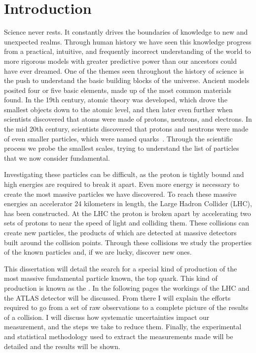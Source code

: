 \chapter{Introduction}
Science never rests. It constantly drives the boundaries of knowledge to new and unexpected realms. Through human history we have seen this knowledge progress from a practical, intuitive, and frequently incorrect understanding of the world to more rigorous models with greater predictive power than our ancestors could have ever dreamed. 
One of the themes seen throughout the history of science is the push to understand the basic building blocks of the universe. Ancient models posited four or five basic elements, made up of the most common materials found. In the 19th century, atomic theory was developed, which drove the smallest objects down to the atomic level, and then later even further when scientists discovered that atoms were made of protons, neutrons, and electrons. In the mid 20th century, scientists discovered that protons and neutrons were made of even smaller particles, which were named quarks~\cite{physicshistory}. Through the scientific process we probe the smallest scales, trying to understand the list of particles that we now consider fundamental.

Investigating these particles can be difficult, as the proton is tightly bound and high energies are required to break it apart. Even more energy is necessary to create the most massive particles we have discovered. To reach these massive energies an accelerator 24 kilometers in length, the Large Hadron Collider (LHC), has been constructed. At the LHC the proton is broken apart by accelerating two sets of protons to near the speed of light and colliding them. These collisions can create new particles, the products of which are detected at massive detectors built around the collision points. Through these collisions we study the properties of the known particles and, if we are lucky, discover new ones.

This dissertation will detail the search for a special kind of production of the most massive fundamental particle known, the top quark. This kind of production is known as the \Wtchan. In the following pages the workings of the LHC and the ATLAS detector will be discussed. From there I will explain the efforts required to go from a set of raw observations to a complete picture of the results of a collision. I will discuss how systematic uncertainties impact our measurement, and the steps we take to reduce them. Finally, the experimental and statistical methodology used to extract the measurements made will be detailed and the results will be shown.
